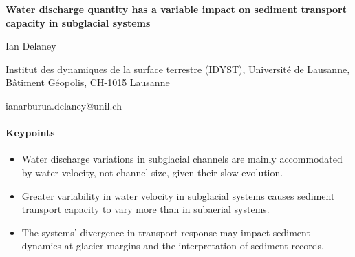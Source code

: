\documentclass[11pt]{article}
\begin{document}
% 
% 


\begin{center}
\Large{\textbf{Water discharge quantity has a variable impact on sediment transport capacity in subglacial systems}}
\normalsize

Ian Delaney


Institut des dynamiques de la surface terrestre (IDYST), Universit\'{e} de Lausanne, B\^{a}timent G\'{e}opolis, CH-1015 Lausanne 

ianarburua.delaney@unil.ch

\end{center}






\paragraph{Keypoints}
\begin{itemize}
\item Water discharge variations in subglacial channels are mainly accommodated by water velocity, not channel size, given their slow evolution.

\item Greater variability in water velocity in subglacial systems causes sediment transport capacity to vary more than in subaerial systems.

\item The systems' divergence in transport response may impact sediment dynamics at glacier margins and the interpretation of sediment records.
\end{itemize}
\end{document}
